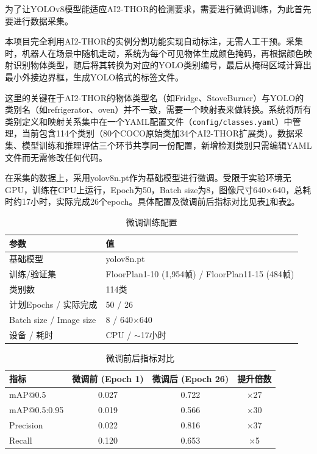 \documentclass{SYSUReport}
\begin{document}
为了让YOLOv8模型能适应AI2-THOR的检测要求，需要进行微调训练，为此首先要进行数据采集。

本项目完全利用AI2-THOR的实例分割功能实现自动标注，无需人工干预。采集时，机器人在场景中随机走动，系统为每个可见物体生成颜色掩码，再根据颜色映射识别物体类型，随后将其转换为对应的YOLO类别编号，最后从掩码区域计算出最小外接边界框，生成YOLO格式的标签文件。

这里的关键在于AI2-THOR的物体类型名（如Fridge、StoveBurner）与YOLO的类别名（如refrigerator、oven）并不一致，需要一个映射表来做转换。系统将所有类别定义和映射关系集中在一个YAML配置文件（\texttt{config/classes.yaml}）中管理，当前包含114个类别（80个COCO原始类加34个AI2-THOR扩展类）。数据采集、模型训练和推理评估三个环节共享同一份配置，新增检测类别只需编辑YAML文件而无需修改任何代码。

在采集的数据上，采用yolov8n.pt作为基础模型进行微调。受限于实验环境无GPU，训练在CPU上运行，Epoch为50，Batch size为8，图像尺寸640×640，总耗时约17小时，实际完成26个epoch。具体配置及微调前后指标对比见表\ref{tab:finetune_config}和表\ref{tab:finetune_results}。

\begin{table}[!ht]
  \centering
  \caption{微调训练配置}
  \label{tab:finetune_config}
  \begin{tabular}{ll}
    \toprule
    参数 & 值 \\
    \midrule
    基础模型 & yolov8n.pt \\
    训练/验证集 & FloorPlan1-10 (1,954帧) / FloorPlan11-15 (484帧) \\
    类别数 & 114类 \\
    计划Epochs / 实际完成 & 50 / 26 \\
    Batch size / Image size & 8 / 640×640 \\
    设备 / 耗时 & CPU / $\sim$17小时 \\
    \bottomrule
  \end{tabular}
\end{table}

\begin{table}[!ht]
  \centering
  \caption{微调前后指标对比}
  \label{tab:finetune_results}
  \begin{tabular}{lccc}
    \toprule
    指标 & 微调前 (Epoch 1) & 微调后 (Epoch 26) & 提升倍数 \\
    \midrule
    mAP@0.5 & 0.027 & 0.722 & $\times$27 \\
    mAP@0.5:0.95 & 0.019 & 0.566 & $\times$30 \\
    Precision & 0.022 & 0.816 & $\times$37 \\
    Recall & 0.120 & 0.653 & $\times$5 \\
    \bottomrule
  \end{tabular}
\end{table}
\end{document}
